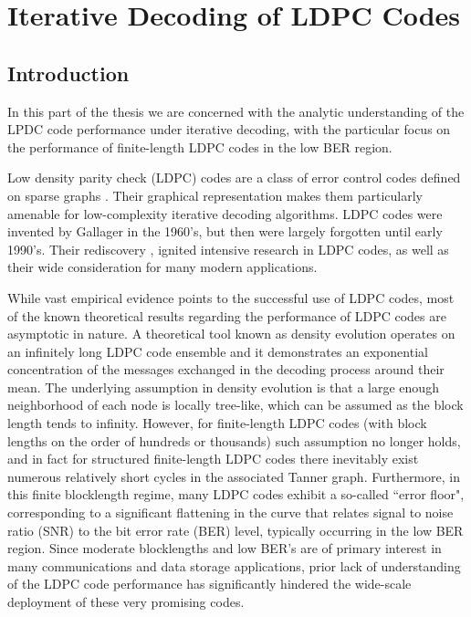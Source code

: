 \part[Iterative Decoding of LDPC Codes]{Iterative Decoding of LDPC
Codes}
\chapter[Introduction]{Introduction}\label{introb}

In this part of the thesis we are concerned with the analytic
understanding of the LPDC code performance under iterative decoding,
with the particular focus on the performance of finite-length LDPC
codes in the low BER region.

Low density parity check (LDPC) codes are a class of error control
codes defined on sparse graphs \cite{gallager}. Their graphical
representation makes them particularly amenable for low-complexity
iterative decoding algorithms. LDPC codes were invented by Gallager
\cite{gallager} in the 1960's, but then were largely forgotten until
early 1990's. Their rediscovery \cite{mackay96}, \cite{foss01}
ignited intensive research in LDPC codes, as well as their wide
consideration for many modern applications.

While vast empirical evidence points to the successful use of LDPC
codes, most of the known theoretical results regarding the
performance of LDPC codes are asymptotic in nature. A theoretical
tool known as density evolution \cite{richurbanke} operates on an
infinitely long LDPC code ensemble and it demonstrates an
exponential concentration of the messages exchanged in the decoding
process around their mean. The underlying assumption in density
evolution is that a large enough neighborhood of each node is
locally tree-like, which can be assumed as the block length tends to
infinity. However, for finite-length LDPC codes (with block lengths
on the order of hundreds or thousands) such assumption no longer
holds, and in fact for structured finite-length LDPC codes there
inevitably exist numerous relatively short cycles in the associated
Tanner graph. Furthermore, in this finite blocklength regime, many
LDPC codes exhibit a so-called ``error floor", corresponding to a
significant flattening in the curve that relates signal to noise
ratio (SNR) to the bit error rate (BER) level, typically occurring
in the low BER region. Since moderate blocklengths and low BER's are
of primary interest in many communications and data storage
applications, prior lack of understanding of the LDPC code
performance has significantly hindered the wide-scale deployment of
these very promising codes.


